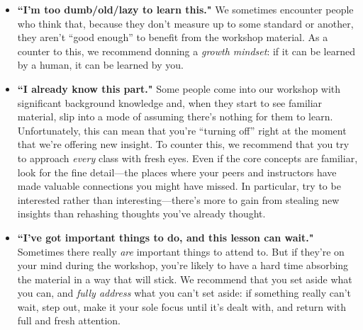 \begin{itemize}
	\item \textbf{``I'm too dumb/old/lazy to learn this."} We sometimes encounter people who think that, because they don't measure up to some standard or another, they aren't ``good enough'' to benefit from the workshop material.  As a counter to this, we recommend donning a \emph{growth mindset}: if it can be learned by a human, it can be learned by you.	
	\item \textbf{``I already know this part."} Some people come into our workshop with significant background knowledge and, when they start to see familiar material, slip into a mode of assuming there's nothing for them to learn.  Unfortunately, this can mean that you're ``turning off'' right at the moment that we're offering new insight.  To counter this, we recommend that you try to approach \emph{every} class with fresh eyes.  Even if the core concepts are familiar, look for the fine detail---the places where your peers and instructors have made valuable connections you might have missed.  In particular, try to be interested rather than interesting---there's more to gain from stealing new insights than rehashing thoughts you've already thought.
	\item \textbf{``I've got important things to do, and this lesson can wait."} Sometimes there really \emph{are} important things to attend to. But if they're on your mind during the workshop, you're likely to have a hard time absorbing the material in a way that will stick. We recommend that you set aside what you can, and \emph{fully address} what you can't set aside: if something really can't wait, step out, make it your sole focus until it's dealt with, and return with full and fresh attention.
\end{itemize}
